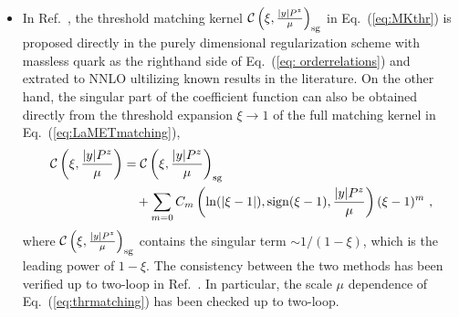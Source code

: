 \documentclass[a4paper,11pt]{article}
\begin{document}
\begin{itemize}
\begin{itemize}
        On the other hand, provided that the threshold expansion for the coefficient function can be promoted to the full leading twist matrix elements~\cite{Liu:2023onm} and can be tested with external finite-mass quark states, the combinations $\frac{1}{\Delta J} \frac{1}{S}$ must remain finite and scheme independent in the $m^2 \rightarrow 0$ limit
        \begin{align} \label{eq: orderrelations}
        \lim_{m^2 \rightarrow 0}\frac{1}{\Delta J\left(\tilde{L}_{p^z},\alpha(\mu)\right)} \frac{1}{S\left(l_z,\alpha(\mu)\right)}={\cal H}_{\rm HL}\left(\ln\frac{-i s_{\lambda }|p^z|}{\mu},\alpha(\mu)\right)\tilde J \left(\frac{\lambda^2}{p_z^2},\alpha(\mu)\right) \ .
        \end{align}
        Here ${\cal H}_{\rm HL}$ and $\tilde J$ on the right hand side are the heavy-light Sudakov hard kernel and the threshold soft factor defined purely in the $\overline{\rm MS}$ scheme for both UV and IR divergences using notations in Refs.~\cite{Ji:2023pba,Liu:2023onm}. In fact, at the one loop level the relation above is checked in this work for the combinations $\frac{1}{\Delta J}$ and $\frac{1}{S}$ separately as shown in Appendix~\ref{sec:1loopfmlcq}.
        \item In Ref.~\cite{Ji:2023pba}, the threshold matching kernel $\mathcal{C}\left(\xi,\frac{|y| P^z}{\mu}\right)_{\rm sg}$ in Eq.~(\ref{eq:MKthr}) is proposed directly in the purely dimensional regularization scheme with massless quark as the righthand side of Eq.~(\ref{eq: orderrelations}) and extrated to NNLO ultilizing known results in the literature.  On the other hand, the singular part of the coefficient function 
        can also be obtained directly from the threshold expansion $\xi \rightarrow 1$ of the full matching kernel in Eq.~(\ref{eq:LaMETmatching}),
        \begin{align}\label{eq:threxp}
        {\cal C}\left(\xi,\frac{|y| P^z}{\mu}\right) &= {\cal C}\left(\xi,\frac{|y| P^z}{\mu}\right)_{\rm sg} \nonumber\\
        &\quad + \sum_{m=0} C_{m}\left(\ln(|\xi-1|),{\rm sign}(\xi-1),\frac{|y| P^z}{\mu}\right) (\xi-1)^{m} \ ,
        \end{align}
        where ${\cal C}\left(\xi,\frac{|y| P^z}{\mu}\right)_{\rm sg}$ contains the singular term $\sim 1/(1-\xi)$, which is the leading power of $1-\xi$.
        The consistency between the two methods has been verified up to two-loop in Ref.~\cite{Ji:2023pba}. In particular, the scale $\mu$ dependence of Eq.~(\ref{eq:thrmatching}) has been checked up to two-loop.
    \end{itemize}
    \fi


\end{itemize}
\end{document}

